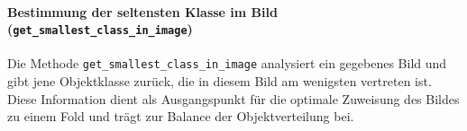 \paragraph{Bestimmung der seltensten Klasse im Bild (\lstinline|get_smallest_class_in_image|)}
\hypertarget{par:get_smallest_class_in_image}{}

Die Methode \lstinline|get_smallest_class_in_image| analysiert ein gegebenes Bild und gibt jene Objektklasse zurück, die in diesem Bild am wenigsten vertreten ist. Diese Information dient als Ausgangspunkt für die optimale Zuweisung des Bildes zu einem Fold und trägt zur Balance der Objektverteilung bei.

